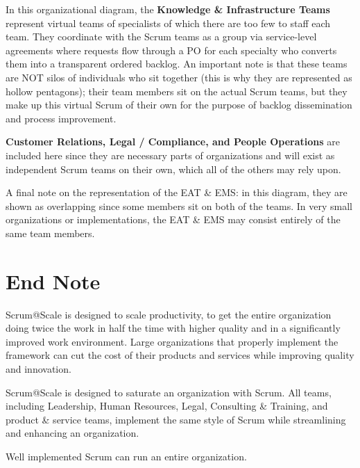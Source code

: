 \documentclass[12pt,a4paper,parskip=full]{scrartcl}
\begin{document}
In this organizational diagram, the \textbf{Knowledge \& Infrastructure
Teams} represent virtual teams of specialists of which there are too few to
staff each team. They coordinate with the Scrum teams as a group via
service-level agreements where requests flow through a PO for each
specialty who converts them into a transparent ordered backlog. An
important note is that these teams are NOT silos of individuals who sit
together (this is why they are represented as hollow pentagons); their team
members sit on the actual Scrum teams, but they make up this virtual Scrum
of their own for the purpose of backlog dissemination and process
improvement.

\textbf{Customer Relations, Legal / Compliance, and People Operations} are
included here since they are necessary parts of organizations and will
exist as independent Scrum teams on their own, which all of the others may
rely upon.

A final note on the representation of the EAT \& EMS: in this diagram, they
are shown as overlapping since some members sit on both of the teams. In very
small organizations or implementations, the EAT \& EMS may consist entirely
of the same team members.

\section{End Note}
Scrum@Scale is designed to scale productivity, to get the entire
organization doing twice the work in half the time with higher quality and
in a significantly improved work environment. Large organizations that
properly implement the framework can cut the cost of their products and
services while improving quality and innovation.

Scrum@Scale is designed to saturate an organization with Scrum. All teams,
including Leadership, Human Resources, Legal, Consulting \& Training, and
product \& service teams, implement the same style of Scrum while
streamlining and enhancing an organization.

Well implemented Scrum can run an entire organization.
\end{document}
